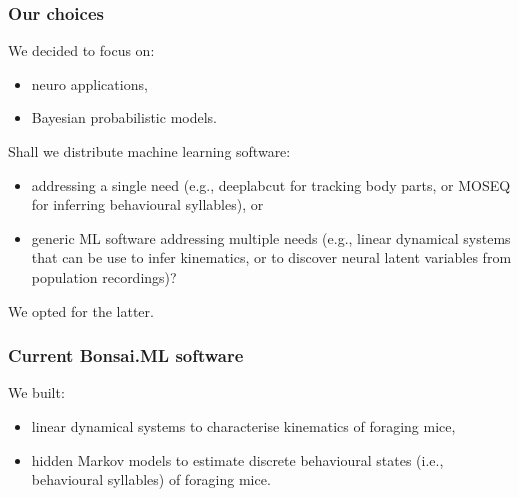 \begin{frame}
    \frametitle{Our choices}

    We decided to focus on:

    \begin{itemize}

        \item neuro applications,

        \item Bayesian probabilistic models.

    \end{itemize}

     {
    Shall we distribute machine learning software:

    \begin{itemize}

        \item addressing a single need (e.g., deeplabcut for tracking body
            parts, or MOSEQ for inferring behavioural syllables), or

        \item generic ML software addressing multiple needs (e.g., linear
            dynamical systems that can be use to infer kinematics, or to
            discover neural latent variables from population recordings)?

    \end{itemize}

    We opted for the latter.
    }

\end{frame}

\begin{frame}
    \frametitle{Current Bonsai.ML software}

    We built:

    \begin{itemize}

        \item linear dynamical systems to characterise kinematics of foraging
            mice,

        \item hidden Markov models to estimate discrete behavioural states
            (i.e., behavioural syllables) of foraging mice.

    \end{itemize}


\end{frame}

